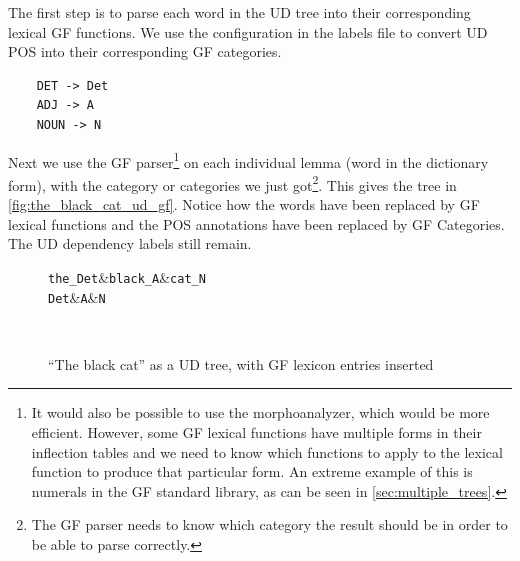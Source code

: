 The first step is to parse each word in the \ac{UD} tree into their corresponding lexical \ac{GF} functions. We use the configuration in the labels file to convert \ac{UD} \ac{POS} into their corresponding \ac{GF} categories.
\begin{verbatim}
    DET -> Det
    ADJ -> A
    NOUN -> N
\end{verbatim}
Next we use the \ac{GF} parser\footnote{It would also be possible to use the morphoanalyzer, which would be more efficient. However, some \ac{GF} lexical functions have multiple forms in their inflection tables and we need to know which functions to apply to the lexical function to produce that particular form. An extreme example of this is numerals in the \ac{GF} standard library, as can be seen in \autoref{sec:multiple_trees}.} on each individual lemma (word in the dictionary form), with the category or categories we just got\footnote{The \ac{GF} parser needs to know which category the result should be in order to be able to parse correctly.}. %
This gives the tree in \autoref{fig:the_black_cat_ud_gf}. Notice how the words have been replaced by \ac{GF} lexical functions and the \ac{POS} annotations have been replaced by \ac{GF} Categories. The \ac{UD} dependency labels still remain.

\begin{figure}[H]
    \centering
    \begin{dependency}
        \begin{deptext}[column sep=0.4cm]
              {\tt the\_Det}\&{\tt black\_A}\&{\tt cat\_N}\\
            {\tt Det}\&{\tt A}\&{\tt N}\\
        \end{deptext}
    \end{dependency} \\
    \caption{``The black cat'' as a UD tree, with GF lexicon entries inserted}
    \label{fig:the_black_cat_ud_gf}
\end{figure}

